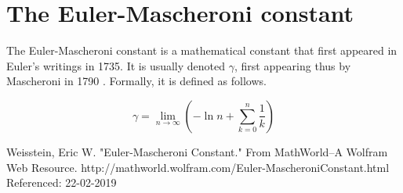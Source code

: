 \documentclass[10pt]{report}
\begin{document}
\section{The Euler-Mascheroni constant}

The Euler-Mascheroni constant is a mathematical constant that first appeared in Euler's writings in 1735. It is usually denoted $\gamma$, first appearing thus by Mascheroni in 1790 \cite{eulerconst}. Formally, it is defined as follows.

\begin{equation}
\gamma = \lim_{n \to \infty}  \left( -\ln{n} + \sum_{k=0}^{n} \frac{1}{k}  \right)
\end{equation}



\begin{thebibliography}{9}
Weisstein, Eric W. "Euler-Mascheroni Constant." From MathWorld--A Wolfram Web Resource. http://mathworld.wolfram.com/Euler-MascheroniConstant.html
Referenced: 22-02-2019


\end{thebibliography}
\end{document}
